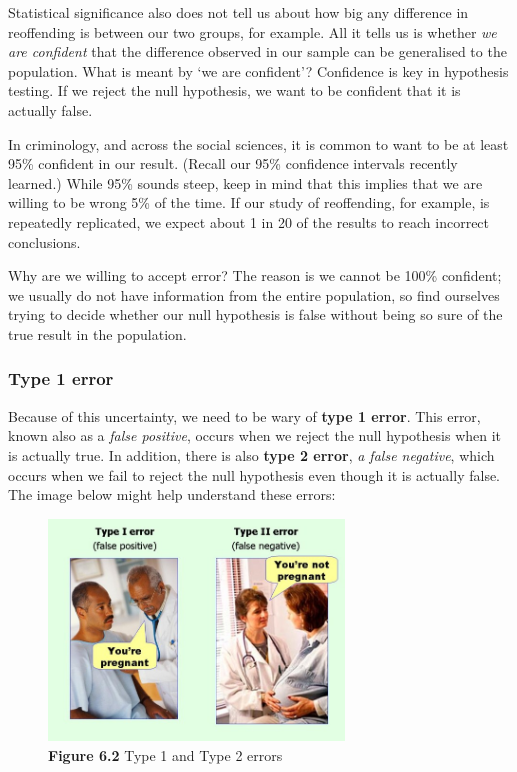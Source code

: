 \documentclass[
]{book}
\begin{document}
Statistical significance also does not tell us about how big any difference in reoffending is between our two groups, for example. All it tells us is whether \emph{we are confident} that the difference observed in our sample can be generalised to the population. What is meant by `we are confident'? Confidence is key in hypothesis testing. If we reject the null hypothesis, we want to be confident that it is actually false.

In criminology, and across the social sciences, it is common to want to be at least 95\% confident in our result. (Recall our 95\% confidence intervals recently learned.) While 95\% sounds steep, keep in mind that this implies that we are willing to be wrong 5\% of the time. If our study of reoffending, for example, is repeatedly replicated, we expect about 1 in 20 of the results to reach incorrect conclusions.

Why are we willing to accept error? The reason is we cannot be 100\% confident; we usually do not have information from the entire population, so find ourselves trying to decide whether our null hypothesis is false without being so sure of the true result in the population.

\hypertarget{type-1-error}{%
\subsubsection{Type 1 error}\label{type-1-error}}

Because of this uncertainty, we need to be wary of \textbf{type 1 error}. This error, known also as a \emph{false positive}, occurs when we reject the null hypothesis when it is actually true. In addition, there is also \textbf{type 2 error}, \emph{a false negative}, which occurs when we fail to reject the null hypothesis even though it is actually false. The image below might help understand these errors:

\begin{figure}
\centering
\includegraphics[width=0.7\textwidth,height=\textheight]{Images/errors.jpg}
\caption{\textbf{Figure 6.2} Type 1 and Type 2 errors}
\end{figure}
\end{document}
